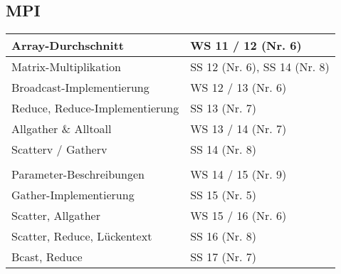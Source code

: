 \subsection*{MPI}
\begin{table}[h]
	\centering
	\begin{tabular}{l|l}
		Array-Durchschnitt
		& WS 11 / 12  (Nr. 6)\\ \hline
		
		Matrix-Multiplikation
		& SS 12 (Nr. 6), SS 14 (Nr. 8) \\ \hline
		
		Broadcast-Implementierung
		& WS 12 / 13 (Nr. 6) \\ \hline
		
		Reduce, Reduce-Implementierung 
		& SS 13 (Nr. 7)\\ \hline
		
		Allgather \& Alltoall 
		& WS 13 / 14 (Nr. 7) \\ \hline	
		
		Scatterv / Gatherv
		& SS 14 (Nr. 8) \\ \hline		
		
		\multlineTable{Send, Recv, Finalize,\\ Parameter-Beschreibungen}
		& WS 14 / 15 (Nr. 9) \\ \hline	
		
		Gather-Implementierung
		& SS 15 (Nr. 5) \\ \hline
		
		Scatter, Allgather
		& WS 15 / 16 (Nr. 6) \\ \hline
		
		Scatter, Reduce, Lückentext
		& SS 16 (Nr. 8) \\ \hline
		
		Bcast, Reduce
		& SS 17 (Nr. 7) \\ \hline
	\end{tabular}
\end{table}
\FloatBarrier

